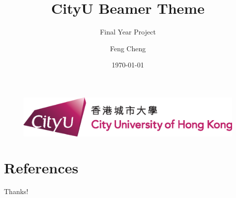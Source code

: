 \documentclass{beamer} %
\author{Feng Cheng}
\title{CityU Beamer Theme}
\subtitle{Final Year Project}
\institute{Department of Electrical Engineering}
\date{\today}
\begin{document}
\begin{frame}
    \titlepage
    \begin{figure}[htpb]
        \begin{center}
            \includegraphics[width=0.5\linewidth]{pic/cityu_horizontal_logo_cmyk.eps}
        \end{center}
    \end{figure}
\end{frame}

\begin{frame}
    \tableofcontents[sectionstyle=show,subsectionstyle=show/shaded/hide,subsubsectionstyle=show/shaded/hide]
\end{frame}








\section{References}

\begin{frame}[allowframebreaks]
    
    
\end{frame}

\begin{frame}
    \begin{center}
        {\Huge\calligra Thanks!}
    \end{center}
\end{frame}
\end{document}
